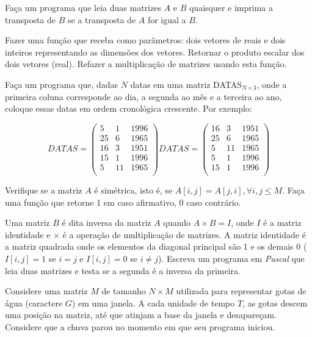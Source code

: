  \item Faça um programa que leia duas matrizes $A$
 e $B$ quaisquer e imprima a transposta de  $B$ se a transposta de $A$
 for igual a $B$.



\item Fazer uma função que receba  como parâmetros:  dois  vetores de
   reais    e   dois   inteiros    representando   as    dimensões   dos
   vetores. Retornar o produto escalar dos dois vetores (real). 
   Refazer a multiplicação de matrizes usando esta função. 


\item Faça um programa que, dadas $N$ datas em uma
matriz DATAS$_{N\times3}$, onde a primeira coluna corresponde ao dia, a segunda ao
mês e a terceira ao ano, coloque essas datas em ordem cronológica
crescente. Por exemplo:

\[
DATAS=\left( \begin{array}{ccc}
5&1&1996\\
25&6&1965\\
16&3&1951\\
15&1&1996\\
5&11&1965\\
\end{array}
\right)
DATAS=\left( \begin{array}{ccc}
16&3&1951\\
25&6&1965\\
5&11&1965\\
5&1&1996\\
15&1&1996\\
\end{array}
\right)
\]


\item Verifique se a matriz $A$ \'e sim\'etrica, isto \'e, se $A[i,j]=A[j,i], \forall i, j \le M$.
Fa\c ca uma fun\c c\~ao que retorne 1 em caso afirmativo, 0 caso contr\'ario.

\item Uma matriz $B$ é dita inversa da matriz $A$ quando $A \times B = I$, 
onde $I$ é a matriz identidade e $\times$ é a operação de multiplicação
de matrizes. A matriz identidade é a matriz quadrada onde os elementos da 
diagonal principal são 1 e os demais 0 ($I[i,j] = 1$ se $i=j$ e 
$I[i,j] = 0$ se $i \neq j$).  Escreva um programa em \emph{Pascal} que 
leia duas matrizes e testa se a segunda é a inversa da primeira.





\item Considere uma matriz $M$ de tamanho $N \times M$
utilizada para representar gotas de água (caractere $G$) em uma
janela. A cada unidade de tempo $T$, as gotas descem uma posição na
matriz, até que atinjam a base da janela e desapareçam. Considere que
a chuva parou no momento em que seu programa iniciou.

